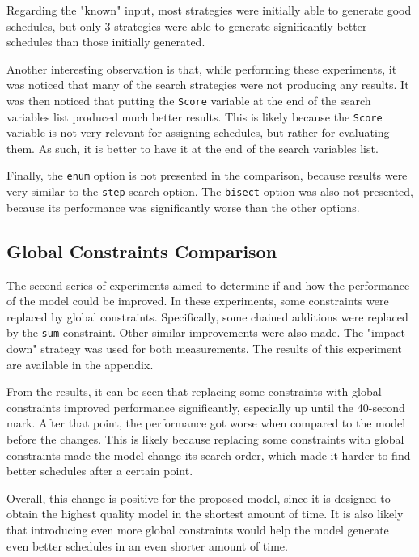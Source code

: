 \documentclass[conference]{IEEEtran}
\begin{document}
Regarding the "known" input, most strategies were initially able to generate good schedules, but only 3 strategies were able to generate significantly better schedules than those initially generated.

Another interesting observation is that, while performing these experiments, it was noticed that many of the search strategies were not producing any results. It was then noticed that putting the \texttt{Score} variable at the end of the search variables list produced much better results. This is likely because the \texttt{Score} variable is not very relevant for assigning schedules, but rather for evaluating them. As such, it is better to have it at the end of the search variables list.

Finally, the \texttt{enum} option is not presented in the comparison, because results were very similar to the \texttt{step} search option. The \texttt{bisect} option was also not presented, because its performance was significantly worse than the other options.

\subsection{Global Constraints Comparison}

The second series of experiments aimed to determine if and how the performance of the model could be improved. In these experiments, some constraints were replaced by global constraints. Specifically, some chained additions were replaced by the \texttt{sum} constraint. Other similar improvements were also made. The "impact down" strategy was used for both measurements. The results of this experiment are available in the appendix.

From the results, it can be seen that replacing some constraints with global constraints improved performance significantly, especially up until the 40-second mark. After that point, the performance got worse when compared to the model before the changes. This is likely because replacing some constraints with global constraints made the model change its search order, which made it harder to find better schedules after a certain point.

Overall, this change is positive for the proposed model, since it is designed to obtain the highest quality model in the shortest amount of time. It is also likely that introducing even more global constraints would help the model generate even better schedules in an even shorter amount of time. 
\end{document}
